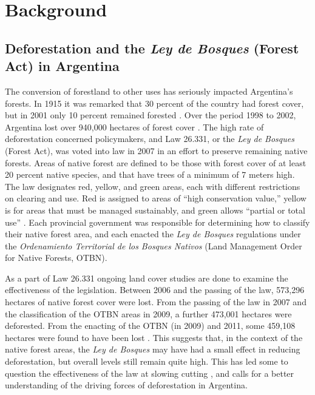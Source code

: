 \chapter{Background}
\section*{Deforestation and the \textit{Ley de Bosques} (Forest Act) in Argentina}

The conversion of forestland to other uses has seriously impacted Argentina’s forests. In 1915 it was remarked that 30 percent of the country had forest cover, but in 2001 only 10 percent remained forested \autocite{secretaria-de-d2001primer}. Over the period 1998 to 2002, Argentina lost over 940,000 hectares of forest cover \autocite{secretaria-de-a2007informe}. The high rate of deforestation concerned policymakers, and Law 26.331, or the \textit{Ley de Bosques} (Forest Act), was voted into law in 2007 in an effort to preserve remaining native forests. Areas of native forest are defined to be those with forest cover of at least 20 percent native species, and that have trees of a minimum of 7 meters high. The law designates red, yellow, and green areas, each with different restrictions on clearing and use. Red is assigned to areas of “high conservation value,” yellow is for areas that must be managed sustainably, and green allows “partial or total use” \autocite[25]{gulezian2009environmental}. Each provincial government was responsible for determining how to classify their native forest area, and each enacted the \textit{Ley de Bosques} regulations under the \textit{Ordenamiento Territorial de los Bosques Nativos} (Land Management Order for Native Forests, OTBN).

As a part of Law 26.331 ongoing land cover studies are done to examine the effectiveness of the legislation. Between 2006 and the passing of the law, 573,296 hectares of native forest cover were lost. From the passing of the law in 2007 and the classification of the OTBN areas in 2009, a further 473,001 hectares were deforested. From the enacting of the OTBN (in 2009) and 2011, some 459,108 hectares were found to have been lost \autocite{secreteria-de-a2012monitoreo}. This suggests that, in the context of the native forest areas, the \textit{Ley de Bosques} may have had a small effect in reducing deforestation, but overall levels still remain quite high. This has led some to question the effectiveness of the law at slowing cutting \autocites{valpreda2012the-protection}{greenpeace-arge2013ley-de-bosques:}, and calls for a better understanding of the driving forces of deforestation in Argentina.


